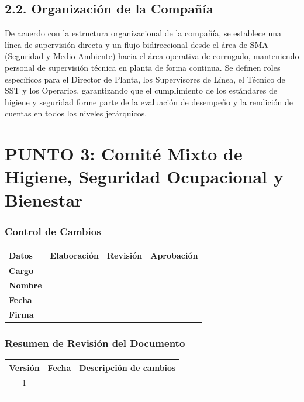 \documentclass[11pt, letterpaper]{article}
\newcommand{\controlcambios}{
    \subsubsection*{Control de Cambios}
    \begin{table}[H]
        \centering
        \small
        \begin{tabular}{lp{4cm}p{4cm}p{4cm}}
            \toprule
            \textbf{Datos} & \textbf{Elaboración} & \textbf{Revisión} & \textbf{Aprobación} \\
            \midrule
            \textbf{Cargo} & & & \\
            \textbf{Nombre} & & & \\
            \textbf{Fecha} & & & \\
            \textbf{Firma} & & & \\
            \bottomrule
        \end{tabular}
    \end{table}
}
\newcommand{\resumenrevision}[1]{
    \subsubsection*{Resumen de Revisión del Documento}
    \begin{table}[H]
        \centering
        \small
        \begin{tabular}{ccp{8cm}}
            \toprule
            \textbf{Versión} & \textbf{Fecha} & \textbf{Descripción de cambios} \\
            \midrule
            #1 & & \\
            & & \\
            & & \\
            \bottomrule
        \end{tabular}
    \end{table}
}
\begin{document}
\subsection{2.2. Organización de la Compañía}
De acuerdo con la estructura organizacional de la compañía, se establece una línea de supervisión directa y un flujo bidireccional desde el área de SMA (Seguridad y Medio Ambiente) hacia el área operativa de corrugado, manteniendo personal de supervisión técnica en planta de forma continua. Se definen roles específicos para el Director de Planta, los Supervisores de Línea, el Técnico de SST y los Operarios, garantizando que el cumplimiento de los estándares de higiene y seguridad forme parte de la evaluación de desempeño y la rendición de cuentas en todos los niveles jerárquicos.

\newpage
\section{PUNTO 3: Comité Mixto de Higiene, Seguridad Ocupacional y Bienestar}
\controlcambios
\resumenrevision{1}
\end{document}
